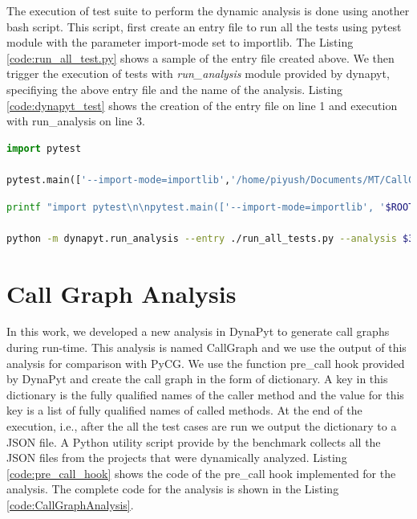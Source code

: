 The execution of test suite to perform the dynamic analysis is done using another bash script.
This script, first create an entry file to run all the tests using pytest module with the parameter import-mode set to importlib.
The Listing \ref{code:run_all_test.py} shows a sample of the entry file created above.
We then trigger the execution of tests with \textit{run\_analysis} module provided by dynapyt, specifiying the above entry file and the name of the analysis.
Listing \ref{code:dynapyt_test} shows the creation of the entry file on line 1 and execution with run\_analysis on line 3.
\begin{lstlisting}[caption=DynaPyt Execution Entry File.,label=code:run_all_test.py,language=Python]
import pytest

pytest.main(['--import-mode=importlib','/home/piyush/Documents/MT/CallGraph/flask-api/flask_api/tests/'])
\end{lstlisting}
\begin{lstlisting}[caption=DynaPyt Test Suite Execution.,label=code:dynapyt_test,language=Bash]
printf "import pytest\n\npytest.main(['--import-mode=importlib', '$ROOT_DIR/temp/project$2/$4'])\n" > run_all_tests.py

python -m dynapyt.run_analysis --entry ./run_all_tests.py --analysis $3
\end{lstlisting}

\section{Call Graph Analysis}
\label{impl:Call Graph Analysis}
In this work, we developed a new analysis in DynaPyt to generate call graphs during run-time.
This analysis is named CallGraph and we use the output of this analysis for comparison with PyCG.
We use the function pre\_call hook provided by DynaPyt and create the call graph in the form of dictionary.
A key in this dictionary is the fully qualified names of the caller method and the value for this key is a list of fully qualified names of called methods.
At the end of the execution, i.e., after the all the test cases are run we output the dictionary to a JSON file.
A Python utility script provide by the benchmark collects all the JSON files from the projects that were dynamically analyzed.
Listing \ref{code:pre_call_hook} shows the code of the pre\_call hook implemented for the analysis.
The complete code for the analysis is shown in the Listing \ref{code:CallGraphAnalysis}.

